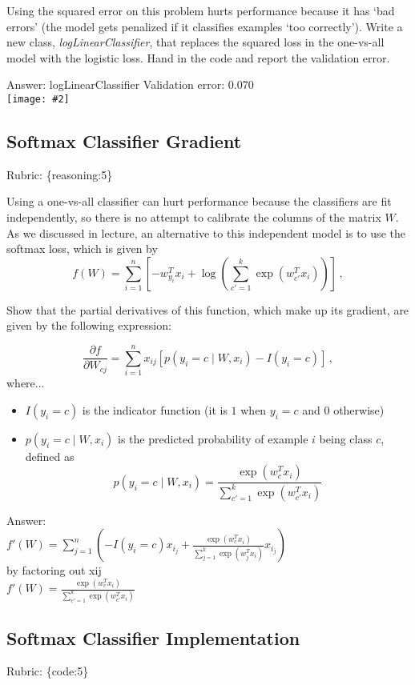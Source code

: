 \documentclass{article}
\def\rubric#1{\gre{Rubric: \{#1\}}}{}
\def\ans#1{\par\gre{Answer: #1}}
\def\blu#1{{\color{blu}#1}}
\def\gre#1{{\color{gre}#1}}
\newcommand{\fig}[2]{\texttt{[image: \#2]}}
\begin{document}
Using the squared error on this problem hurts performance because it has `bad errors' (the model gets penalized if it classifies examples `too correctly').
Write a new class, \emph{logLinearClassifier}, that replaces the squared loss in the one-vs-all model with the logistic loss. \blu{Hand in the code and report the validation error}.

\ans{logLinearClassifier Validation error: 0.070}\\
\fig{1}{../figs/log}


\subsection{Softmax Classifier Gradient}
\rubric{reasoning:5}

Using a one-vs-all classifier can hurt performance because the classifiers are fit independently, so there is no attempt to calibrate the columns of the matrix $W$. As we discussed in lecture, an alternative to this independent model is to use the softmax loss, which is given by
\[
f(W) = \sum_{i=1}^n \left[-w_{y_i}^Tx_i + \log\left(\sum_{c' = 1}^k \exp(w_{c'}^Tx_i)\right)\right] \, ,
\]

\blu{Show that the partial derivatives of this function, which make up its gradient, are given by the following expression:}

\[
\frac{\partial f}{\partial W_{cj}} = \sum_{i=1}^n x_{ij}[p(y_i=c \mid W,x_i) - I(y_i = c)] \, ,
\]
where...
\begin{itemize}
\item $I(y_i = c)$ is the indicator function (it is $1$ when $y_i=c$ and $0$ otherwise)
\item $p(y_i=c \mid W, x_i)$ is the predicted probability of example $i$ being class $c$, defined as
\[
p(y_i=c \mid W, x_i) = \frac{\exp(w_c^Tx_i)}{\sum_{c'=1}^k\exp(w_{c'}^Tx_i)}
\]

\end{itemize}
\ans{\\
$f'(W) = \sum_{j=1}^n(-I(y_i = c)x_i_j +\frac{\exp(w_c^Tx_i)}{\sum_{j=1}^k \exp(w_j^Tx_i)}x_i_j)$\\
by factoring out xij\\
$f'(W) = \frac{\exp(w_c^Tx_i)}{\sum_{c'=1}^k\exp(w_{c'}^Tx_i)}$
}

\subsection{Softmax Classifier Implementation}
\rubric{code:5}
\end{document}
